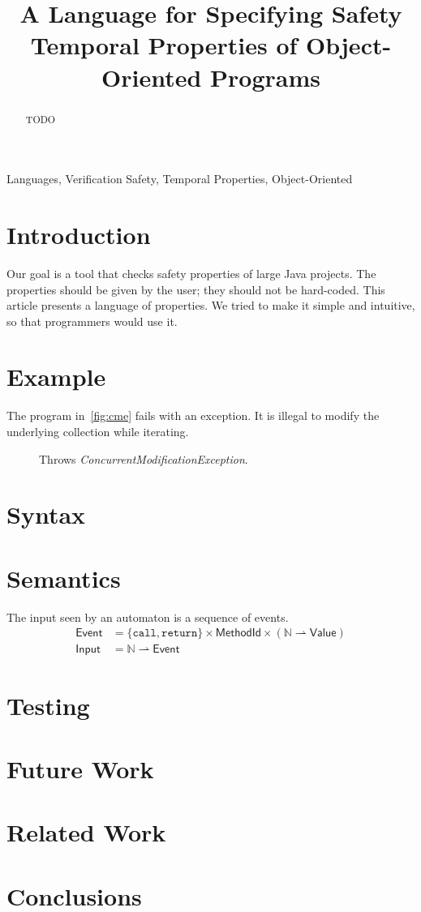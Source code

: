 \documentclass[preprint]{sigplanconf} %
\title{A Language for Specifying Safety Temporal Properties of Object-Oriented Programs}
\newcommand{\N}{\ensuremath{\mathbb{N}}}
\newcommand{\pmap}{\rightharpoonup}
\newcommand{\set}[1]{\ensuremath{\mathsf{#1}}}
\begin{document}
\maketitle

\begin{abstract} %
TODO
\end{abstract}
\terms Languages, Verification
\keywords Safety, Temporal Properties, Object-Oriented

\section{Introduction} %

Our goal is a tool that checks safety properties of large Java projects.
The properties should be given by the user; they should not be hard-coded.
This article presents a language of properties.
We tried to make it simple and intuitive, so that programmers would use it.

\section{Example} %

The program in~\autoref{fig:cme} fails with an exception.
It is illegal to modify the underlying collection while iterating.

\begin{figure}\centering

\caption{Throws \textit{ConcurrentModificationException}.}
\label{fig:cme}
\end{figure}

\section{Syntax} %

\section{Semantics} %

The input seen by an automaton is a sequence of events.
\begin{align}
\set{Event}&=\{\mathtt{call}, \mathtt{return}\}\times \set{MethodId} \times (\N \pmap \set{Value}) \\
\set{Input}&=\N\pmap\set{Event}
\end{align}

\section{Testing} %

\section{Future Work} %

\section{Related Work} %

\section{Conclusions} %

\end{document}
